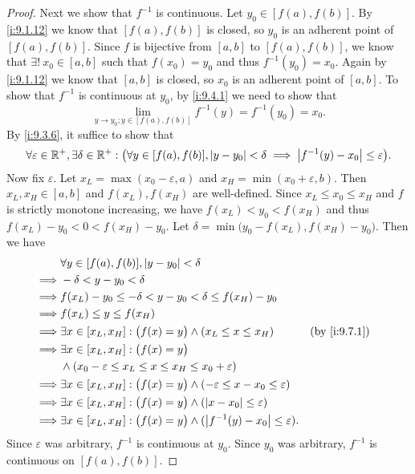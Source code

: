 \begin{proof}
  Next we show that \(f^{-1}\) is continuous.
  Let \(y_0 \in [f(a), f(b)]\).
  By \cref{i:9.1.12} we know that \([f(a), f(b)]\) is closed, so \(y_0\) is an adherent point of \([f(a), f(b)]\).
  Since \(f\) is bijective from \([a, b]\) to \([f(a), f(b)]\), we know that \(\exists!\ x_0 \in [a, b]\) such that \(f(x_0) = y_0\) and thus \(f^{-1}(y_0) = x_0\).
  Again by \cref{i:9.1.12} we know that \([a, b]\) is closed, so \(x_0\) is an adherent point of \([a, b]\).
  To show that \(f^{-1}\) is continuous at \(y_0\), by \cref{i:9.4.1} we need to show that
  \[
    \lim_{y \to y_0 ; y \in [f(a), f(b)]} f^{-1}(y) = f^{-1}(y_0) = x_0.
  \]
  By \cref{i:9.3.6}, it suffice to show that
  \[
    \forall \varepsilon \in \mathbb{R}^+, \exists \delta \in \mathbb{R}^+ : \big(\forall y \in [f(a), f(b)], \left\lvert y - y_0\right\rvert < \delta \implies \left\lvert f^{-1}(y) - x_0\right\rvert \leq \varepsilon\big).
  \]
  Now fix \(\varepsilon\).
  Let \(x_L = \max(x_0 - \varepsilon, a)\) and \(x_H = \min(x_0 + \varepsilon, b)\).
  Then \(x_L, x_H \in [a, b]\) and \(f(x_L), f(x_H)\) are well-defined.
  Since \(x_L \leq x_0 \leq x_H\) and \(f\) is strictly monotone increasing, we have \(f(x_L) < y_0 < f(x_H)\) and thus \(f(x_L) - y_0 < 0 < f(x_H) - y_0\).
  Let \(\delta = \min\big(y_0 - f(x_L), f(x_H) - y_0\big)\).
  Then we have
  \begin{align*}
             & \forall y \in [f(a), f(b)], \abs{y - y_0} < \delta                                                                 \\
    \implies & -\delta < y - y_0 < \delta                                                                                         \\
    \implies & f(x_L) - y_0 \leq -\delta < y - y_0 < \delta \leq f(x_H) - y_0                                                     \\
    \implies & f(x_L) \leq y \leq f(x_H)                                                                                          \\
    \implies & \exists x \in [x_L, x_H] : \big(f(x) = y\big) \land (x_L \leq x \leq x_H)                        &  & \by{i:9.7.1} \\
    \implies & \exists x \in [x_L, x_H] : \big(f(x) = y\big)                                                                      \\
             & \land (x_0 - \varepsilon \leq x_L \leq x \leq x_H \leq x_0 + \varepsilon)                                          \\
    \implies & \exists x \in [x_L, x_H] : \big(f(x) = y\big) \land (-\varepsilon \leq x - x_0 \leq \varepsilon)                   \\
    \implies & \exists x \in [x_L, x_H] : \big(f(x) = y\big) \land (\abs{x - x_0} \leq \varepsilon)                               \\
    \implies & \exists x \in [x_L, x_H] : \big(f(x) = y\big) \land (\abs{f^{-1}(y) - x_0} \leq \varepsilon).
  \end{align*}
  Since \(\varepsilon\) was arbitrary, \(f^{-1}\) is continuous at \(y_0\).
  Since \(y_0\) was arbitrary, \(f^{-1}\) is continuous on \([f(a), f(b)]\).


\end{proof}
